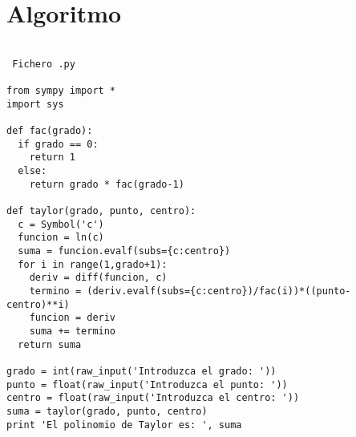 \section{Algoritmo}
\label{Apendice1:Python}
\begin{verbatim}

 Fichero .py

from sympy import *
import sys
 
def fac(grado):
  if grado == 0:
    return 1
  else:
    return grado * fac(grado-1)

def taylor(grado, punto, centro):
  c = Symbol('c')
  funcion = ln(c)
  suma = funcion.evalf(subs={c:centro})
  for i in range(1,grado+1):
    deriv = diff(funcion, c)
    termino = (deriv.evalf(subs={c:centro})/fac(i))*((punto-centro)**i)
    funcion = deriv
    suma += termino
  return suma

grado = int(raw_input('Introduzca el grado: '))
punto = float(raw_input('Introduzca el punto: '))
centro = float(raw_input('Introduzca el centro: '))
suma = taylor(grado, punto, centro)
print 'El polinomio de Taylor es: ', suma
\end{verbatim}
